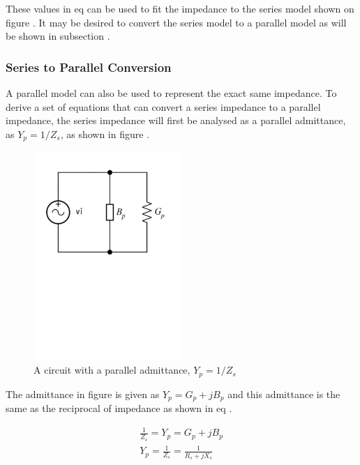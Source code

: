 These values in eq  can be used to fit the impedance to the series model shown on figure . It may be desired to convert the series model to a parallel model as will be shown in subsection .

\subsubsection{Series to Parallel Conversion} \label{subsec:SeriesToParallel_conv}

A parallel model can also be used to represent the exact same impedance. To derive a set of equations that can convert a series impedance to a parallel impedance, the series impedance will first be analysed as a parallel admittance, as $Y_p = 1/Z_s$, as shown in figure .

\begin{figure}[H]
    \centering
    \includegraphics[clip, trim=0 400 0 0, width=0.5\textwidth]{Sections/4_TechnicalAnalysis/Figures/4_1_5_ParallelAdmittance.pdf}
    \caption{A circuit with a parallel admittance, $Y_p = 1/Z_s$}
    \label{fig:4_1_5_ParallelAdmittance}
\end{figure}

The admittance in figure  is given as $Y_p = G_p + jB_p$ and this admittance is the same as the reciprocal of impedance as shown in eq .

\begin{equation}\label{eq:4_1_5_ParallelModely1}
    \begin{split}
        \frac{1}{Z_s}= Y_p = G_p +jB_p \\
    Y_p = \frac{1}{Z_s} = \frac{1}{R_s + jX_s} 
    \end{split}
\end{equation}

